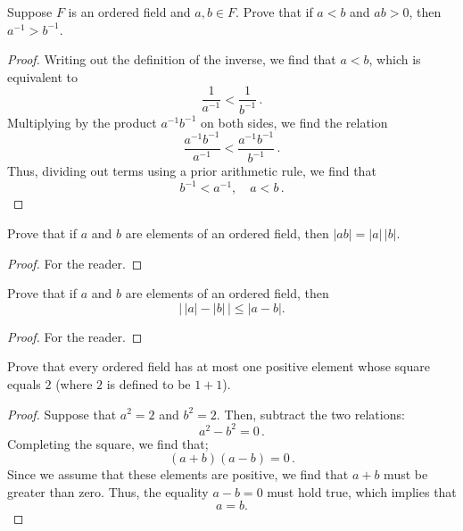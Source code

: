 \fullpageboxline
\begin{problem}
Suppose $F$ is an ordered field and $a, b \in F$. Prove that if $a < b$ and $ab > 0$, then $a^{-1} > b^{-1}$.
\end{problem}
\begin{proof}
    Writing out the definition of the inverse, we find that $a < b$, which is equivalent to 
    \begin{equation*}
        \frac{1}{a^{-1}} < \frac{1}{b^{-1}}\,.
    \end{equation*}
    Multiplying by the product $a^{-1}b^{-1}$ on both sides, we find the relation
    \begin{equation*}
        \frac{a^{-1}b^{-1}}{a^{-1}} < \frac{a^{-1}b^{-1}}{b^{-1}}\,.
    \end{equation*}
    Thus, dividing out terms using a prior arithmetic rule, we find that 
    \begin{equation*}
        b^{-1} < a^{-1},\quad a < b\,.
    \end{equation*}
\end{proof}

\fullpageboxline
\begin{problem}
Prove that if $a$ and $b$ are elements of an ordered field, then $|ab| = |a|\,|b|$.
\end{problem}
\begin{proof}
    For the reader.
\end{proof}

\fullpageboxline
\begin{problem}
Prove that if $a$ and $b$ are elements of an ordered field, then
\[
\bigl|\,|a| - |b|\,\bigr| \le |a - b|.
\]
\end{problem}
\begin{proof}
    For the reader.
\end{proof}

\fullpageboxline
\begin{problem}
Prove that every ordered field has at most one positive element whose square equals $2$ (where $2$ is defined to be $1 + 1$).
\end{problem}
\begin{proof}
    Suppose that $a^2 = 2$ and $b^2 = 2$. Then, subtract the two relations:
    \begin{equation*}
        a^2 - b^2 = 0\,.
    \end{equation*}
    Completing the square, we find that;
    \begin{equation*}
        (a + b)(a - b) = 0\,.
    \end{equation*}
    Since we assume that these elements are positive, we find that $a + b$ must be greater than zero.  Thus, the equality $a - b = 0$ must hold true, which implies that 
    \begin{equation*}
        a = b.
    \end{equation*}
\end{proof}

